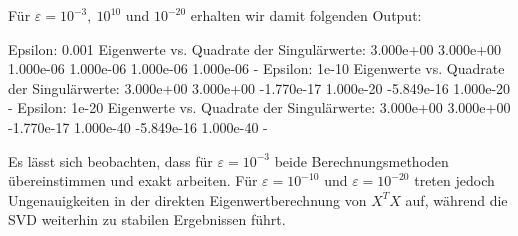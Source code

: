 Für \(\varepsilon=10^{-3},\ 10^{10}\) und \(10^{-20}\) erhalten wir damit folgenden Output: 
\begin{outputcode}
    Epsilon: 0.001
    Eigenwerte vs. Quadrate der Singulärwerte:
    3.000e+00        3.000e+00
    1.000e-06        1.000e-06
    1.000e-06        1.000e-06
    -
    Epsilon: 1e-10
    Eigenwerte vs. Quadrate der Singulärwerte:
    3.000e+00        3.000e+00
    -1.770e-17       1.000e-20
    -5.849e-16       1.000e-20
    -
    Epsilon: 1e-20
    Eigenwerte vs. Quadrate der Singulärwerte:
    3.000e+00        3.000e+00
    -1.770e-17       1.000e-40
    -5.849e-16       1.000e-40
    -
\end{outputcode}
Es lässt sich beobachten, dass für \(\varepsilon = 10^{-3}\) beide Berechnungsmethoden übereinstimmen und exakt arbeiten. 
Für \(\varepsilon=10^{-10}\) und \(\varepsilon = 10^{-20}\) treten jedoch Ungenauigkeiten in der direkten Eigenwertberechnung von \(X^{T}X\) auf, während die SVD weiterhin zu stabilen Ergebnissen führt.
